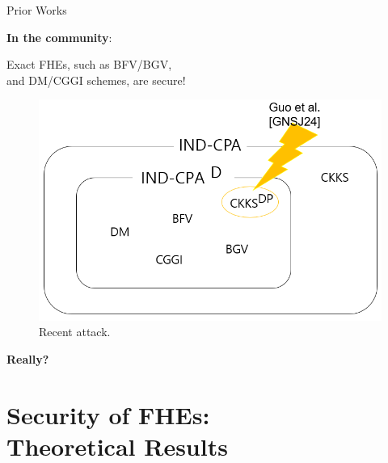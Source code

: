 \documentclass{beamer}
\begin{document}
    \begin{frame}{Prior Works}
    
    {\bf In the community}: 
    \begin{center}
        Exact FHEs, such as BFV/BGV,\\ and DM/CGGI schemes, are \indcpad secure!
    \end{center}\vspace{0.1cm}

        \begin{figure}[h]
            \centering
            \includegraphics[width=0.7\linewidth]{diagram 2.png}
            \caption{Recent attack. }
        \end{figure}
    \end{frame}

    
    \begin{frame}{}
    \begin{center}
        {\Huge \bf Really?}
    \end{center} 
    \end{frame}

\section{\indcpad Security of FHEs:\\ {\normalsize Theoretical Results}}
\end{document}

